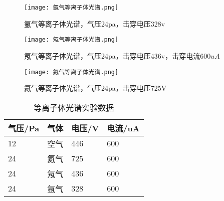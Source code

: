 \documentclass[dvipsnames, svgnames,a4paper,11pt]{article}
\begin{document}
	\begin{figure}[htbp]
		\centering
		\texttt{[image: 氩气等离子体光谱.png]}
		\caption{氩气等离子体光谱，气压24pa，击穿电压328v}
		\label{fig:氩气等离子体光谱}
	\end{figure}
	
	\begin{figure}[htbp]
		\centering
		\texttt{[image: 氖气等离子体光谱.png]}
		\caption{氖气等离子体光谱，气压24pa，击穿电压436v，击穿电流600$uA$}
		\label{fig:氩气等离子体光谱}
	\end{figure}

	\begin{figure}[htbp]
		\centering
		\texttt{[image: 氦气等离子体光谱.png]}
		\caption{氦气等离子体光谱，气压24pa，击穿电压725V}
		\label{fig:氦气等离子体光谱}
	\end{figure}
	

	\begin{table}[!ht]
		\centering
		\begin{tabular}{|l|l|l|l|}
		\hline
			气压/Pa & 气体 & 电压/V & 电流/uA \\ \hline
			12 & 空气 & 446 & 600 \\ \hline
			24 & 氦气 & 725 & 600 \\ \hline
			24 & 氖气 & 436 & 600 \\ \hline
			24 & 氩气 & 328 & 600 \\ \hline
		\end{tabular}
		\caption{等离子体光谱实验数据}
		\label{等离子体光谱实验数据}
	\end{table}
\end{document}
